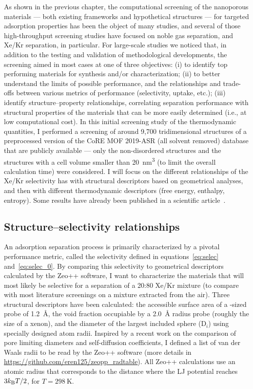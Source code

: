\documentclass[main.tex]{subfiles}
\begin{document}
As shown in the previous chapter, the computational screening of the nanoporous materials --- both existing frameworks and hypothetical structures --- for targeted adsorption properties has been the object of many studies, and several of those high-throughput screening studies have focused on noble gas separation, and Xe/Kr separation, in particular. For large-scale studies we noticed that, in addition to the testing and validation of methodological developments, the screening aimed in most cases at one of three objectives: (i) to identify top performing materials for synthesis and/or characterization; (ii) to better understand the limits of possible performance, and the relationships and trade-offs between various metrics of performance (selectivity, uptake, etc.); (iii) identify structure--property relationships, correlating separation performance with structural properties of the materials that can be more easily determined (i.e., at low computational cost). In this initial screening study of the thermodynamic quantities, I performed a screening of around 9,700 tridimensional structures of a preprocessed version of the CoRE MOF 2019-ASR (all solvent removed) database that are publicly available --- only the non-disordered structures and the structures with a cell volume smaller than \SI{20}{\nano\meter\cubed} (to limit the overall calculation time) were considered. I will focus on the different relationships of the Xe/Kr selectivity has with structural descriptors based on geometrical analyses, and then with different thermodynamic descriptors (free energy, enthalpy, entropy). Some results have already been published in a scientific article~\cite{Ren_2021}.

\subsection{Structure--selectivity relationships}\label{sct:geometry}

An adsorption separation process is primarily characterized by a pivotal performance metric, called the selectivity defined in equations~\ref{eq:selec} and~\ref{eq:selec_0}. By comparing this selectivity to geometrical descriptors calculated by the Zeo++ software,\autocite{Zeo++} I want to characterize the materials that will most likely be selective for a separation of a 20:80 Xe/Kr mixture (to compare with most literature screenings on a mixture extracted from the air). Three structural descriptors have been calculated: the accessible surface area of a -sized probe of \SI{1.2}{\angstrom}, the void fraction occupiable by a \SI{2.0}{\angstrom} radius probe (roughly the size of a xenon),\autocite{vol_Ongari2017} and the diameter of the largest included sphere (D$_i$) using specially designed atom radii. Inspired by a recent work on the comparison of pore limiting diameters and self-diffusion coefficients,\autocite{Hung_2021} I defined a list of van der Waals radii to be read by the Zeo++ software (more details in \url{https://github.com/eren125/zeopp_radtable}). All Zeo++ calculations use an atomic radius that corresponds to the distance where the LJ potential reaches $3 k_{\text{B}} T/2$, for $T = \SI{298}{\kelvin}$.
\end{document}
